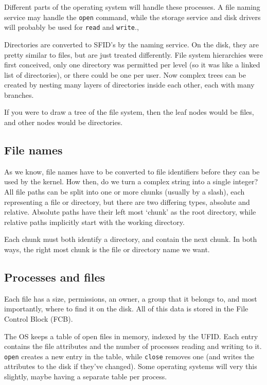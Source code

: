 Different parts of the operating system will handle these processes. A file
naming service may handle the \texttt{open} command, while the storage service
and disk drivers will probably be used for \texttt{read} and \texttt{write}.,

Directories are converted to SFID's by the naming service. On the disk, they are
pretty similar to files, but are just treated differently. File system
hierarchies were first conceived, only one directory was permitted per level (so
it was like a linked list of directories), or there could be one per user. Now
complex trees can be created by nesting many layers of directories inside each
other, each with many branches.

If you were to draw a tree of the file system, then the leaf nodes would be
files, and other nodes would be directories.

\subsection{File names}


As we know, file names have to be converted to file identifiers before they can
be used by the kernel. How then, do we turn a complex string into a single
integer? All file paths can be split into one or more chunks (usually by a
slash), each representing a file or directory, but there are two differing
types, absolute and relative. Absolute paths have their left most `chunk' as the
root directory, while relative paths implicitly start with the working
directory. 

Each chunk must both identify a directory, and contain the next chunk. In both
ways, the right most chunk is the file or directory name we want.

\subsection{Processes and files}

Each file has a size, permissions, an owner, a group that it belongs to, and
most importantly, where to find it on the disk. All of this data is stored in
the File Control Block (FCB).

The OS keeps a table of open files in memory, indexed by the UFID. Each entry
contains the file attributes and the number of processes reading and writing to
it. \texttt{open} creates a new entry in the table, while \texttt{close} removes
one (and writes the attributes to the disk if they've changed). Some operating
systems will very this slightly, maybe having a separate table per process.

